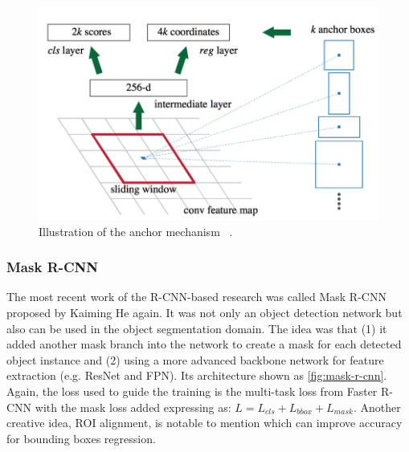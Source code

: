 \begin{figure}
    \begin{center}
    \includegraphics[scale=0.6]{figures/anchor.png}
    \end{center}
    \caption{Illustration of the anchor mechanism
    ~\protect\cite{faster-r-cnn-paper-2015}.}
    \label{fig:anchor}
\end{figure}


\subsubsection{Mask R-CNN}

The most recent work of the R-CNN-based research was called Mask
R-CNN \cite{mask-r-cnn-paper-2017} proposed
by Kaiming He again. It was not only an object detection network but also can be
used in the object segmentation domain. The idea
was that (1) it added another mask branch into the network to create a mask for
each detected object instance and (2) using a
more advanced backbone network for feature extraction (e.g. ResNet and FPN).
Its architecture shown as \autoref{fig:mask-r-cnn}.
Again, the loss used to guide the training is the multi-task loss from Faster
R-CNN with the mask loss added expressing as:
$L = L_{cls} + L_{bbox} + L_{mask}$. Another creative idea, ROI alignment, is
notable to mention which can improve accuracy for bounding boxes regression.

